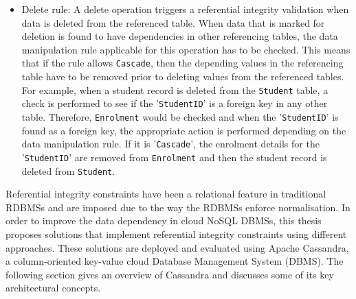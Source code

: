 \begin{itemize}
		\item Delete rule: A delete operation triggers a referential integrity
		validation when data is deleted from the referenced table.  When data that is
		marked for deletion is found to have dependencies in other referencing tables,  
		the data manipulation rule applicable for this operation has to be checked. 
		This means that if the rule allows \texttt{Cascade},   then the depending values
		in the referencing table have to be removed prior to deleting values from the
		referenced tables.  For example,   when a student record is deleted from the
		\texttt{Student} table,   a check is performed to see if the
		'\texttt{StudentID}' is a foreign key in any other table.  Therefore,  
		\texttt{Enrolment} would be checked and when the '\texttt{StudentID}' is found
		as a foreign key,   the appropriate action is performed depending on the data
		manipulation rule.  If it is '\texttt{Cascade}',   the enrolment details for the
		'\texttt{StudentID}' are removed from \texttt{Enrolment} and then the student
		record is deleted from
		\texttt{Student}. 
	
	\end{itemize}

Referential integrity constraints have been a relational feature in traditional
\acp{RDBMS} and are imposed due to the way the \acp{RDBMS} enforce
normalisation.
In order to improve the data dependency in cloud \ac{NoSQL} \acp{DBMS},   this
thesis proposes solutions that implement referential integrity constraints using
different approaches. These solutions are
deployed and evaluated using Apache Cassandra, a column-oriented key-value cloud
Database Management System (DBMS). The following section gives an overview of
Cassandra and discusses some of its key architectural concepts.
 

